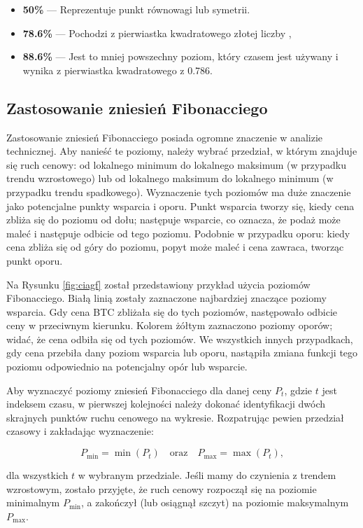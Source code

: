 \documentclass[12pt,a4paper,twoside, inzynierska]{pwr_wmat_praca_dyplomowa}
\theoremstyle{plain}
\numberwithin{theorem}{chapter}
\theoremstyle{definition}
\numberwithin{theorem}{chapter}
\begin{document}
	\begin{itemize}
		\item \textbf{50\%} --- Reprezentuje punkt równowagi lub symetrii. 
		\item \textbf{78.6\%} --- Pochodzi z pierwiastka kwadratowego złotej liczby ,
		\item \textbf{88.6\%} --- Jest to mniej powszechny poziom, który czasem jest używany i wynika z pierwiastka kwadratowego z 0.786.
	\end{itemize}
	
	\subsection{Zastosowanie zniesień Fibonacciego}
	
	Zastosowanie zniesień Fibonacciego posiada ogromne znaczenie w analizie technicznej. Aby nanieść te poziomy, należy wybrać przedział, w którym znajduje się ruch cenowy: od lokalnego minimum do lokalnego maksimum (w przypadku trendu wzrostowego) lub od lokalnego maksimum do lokalnego minimum (w przypadku trendu spadkowego). Wyznaczenie tych poziomów ma duże znaczenie jako potencjalne punkty wsparcia i oporu. Punkt wsparcia tworzy się, kiedy cena zbliża się do poziomu od dołu; następuje wsparcie, co oznacza, że podaż może maleć i następuje odbicie od tego poziomu. Podobnie w przypadku oporu: kiedy cena zbliża się od góry do poziomu, popyt może maleć i cena zawraca, tworząc punkt oporu.
	
	Na Rysunku \ref{fig:ciagf} został przedstawiony przykład użycia poziomów Fibonacciego. Białą linią zostały zaznaczone najbardziej znaczące poziomy wsparcia. Gdy cena BTC zbliżała się do tych poziomów, następowało odbicie ceny w przeciwnym kierunku. Kolorem żółtym zaznaczono poziomy oporów; widać, że cena odbiła się od tych poziomów. We wszystkich innych przypadkach, gdy cena przebiła dany poziom wsparcia lub oporu, nastąpiła zmiana funkcji tego poziomu odpowiednio na potencjalny opór lub wsparcie.
	
	Aby wyznaczyć poziomy zniesień Fibonacciego dla danej ceny \( P_t \), gdzie \( t \) jest indeksem czasu, w pierwszej kolejności należy dokonać identyfikacji dwóch skrajnych punktów ruchu cenowego na wykresie. Rozpatrując pewien przedział czasowy i zakładając wyznaczenie:
	
	\[
	P_{\text{min}} = \min(P_t) \quad \text{oraz} \quad P_{\text{max}} = \max(P_t),
	\]
	
	dla wszystkich \( t \) w wybranym przedziale. Jeśli mamy do czynienia z trendem wzrostowym, zostało przyjęte, że ruch cenowy rozpoczął się na poziomie minimalnym \( P_{\text{min}} \), a zakończył (lub osiągnął szczyt) na poziomie maksymalnym \( P_{\text{max}} \).
	
\end{document}
